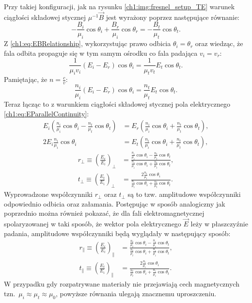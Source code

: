 Przy takiej konfiguracji, jak na rysunku \ref{ch1:img:fresnel_setup_TE} warunek ciągłości składowej stycznej $\mu^{-1}\vec{B}$ jest wyrażony poprzez następujące równanie:
\begin{equation}
-\frac{B_i}{\mu_i}\cos\theta_i + \frac{B_r}{\mu_i}\cos\theta_r = -\frac{B_t}{\mu_t}\cos\theta_t.
\end{equation}
Z \eqref{ch1:eq:EBRelationship}, wykorzystując prawo odbicia $\theta_i = \theta_r$ oraz wiedząc, że fala odbita propaguje się w tym samym ośrodku co fala padająca $v_i = v_r$:
\begin{equation}
\frac{1}{\mu_iv_i}\left( E_i - E_r \right)\cos\theta_i = \frac{1}{\mu_tv_t}E_t\cos\theta_t.
\end{equation}
Pamiętając, że $n = \frac{c}{v}$:
\begin{equation}
\frac{n_i}{\mu_i}\left(E_i - E_r \right)\cos\theta_i = \frac{n_t}{\mu_t}E_t\cos\theta_t.
\end{equation}
Teraz łącząc to z warunkiem ciągłości składowej stycznej pola elektrycznego \eqref{ch1:eq:EParallelContinuity}:
\begin{align}
E_i\left( \frac{n_i}{\mu_i}\cos\theta_i - \frac{n_t}{\mu_t}\cos\theta_t \right) &= E_r\left( \frac{n_i}{\mu_i}\cos\theta_i + \frac{n_t}{\mu_t}\cos\theta_t \right),\\
2E_i\frac{n_i}{\mu_i}\cos\theta_i &= E_t\left( \frac{n_i}{\mu_i}\cos\theta_i + \frac{n_t}{\mu_t}\cos\theta_t \right),
\end{align}
\begin{align}
\label{ch1:eq:rPerpendicularGeneral}
r_\perp\equiv \left(\frac{E_r}{E_i}\right)_\perp &= \frac{\frac{n_i}{\mu_i}\cos\theta_i - \frac{n_t}{\mu_t}\cos\theta_t}{\frac{n_i}{\mu_i}\cos\theta_i + \frac{n_t}{\mu_t}\cos\theta_t},\\
t_\perp\equiv \left(\frac{E_t}{E_i}\right)_\perp &= \frac{2\frac{n_i}{\mu_i}\cos\theta_i}{\frac{n_i}{\mu_i}\cos\theta_i + \frac{n_t}{\mu_t}\cos\theta_t}.
\end{align}
Wyprowadzone współczynniki $r_\perp$ oraz $t_\perp$ są to tzw. amplitudowe współczynniki odpowiednio odbicia oraz załamania.
Postępując w sposób analogiczny jak poprzednio można również pokazać, że dla fali elektromagnetycznej spolaryzowanej w taki sposób, że wektor pola elektrycznego $\vec{E}$ leży w płaszczyźnie padania, amplitudowe współczynniki będą wyglądały w następujący sposób:
\begin{align}
\label{ch1:eq:rParallelGeneral}
r_\parallel\equiv \left(\frac{E_r}{E_i}\right)_\parallel &= \frac{\frac{n_t}{\mu_t}\cos\theta_i - \frac{n_i}{\mu_i}\cos\theta_t}{\frac{n_t}{\mu_t}\cos\theta_i + \frac{n_i}{\mu_i}\cos\theta_t},\\
t_\parallel\equiv \left(\frac{E_t}{E_i}\right)_\parallel &= \frac{2\frac{n_i}{\mu_i}\cos\theta_i}{\frac{n_t}{\mu_t}\cos\theta_i + \frac{n_i}{\mu_i}\cos\theta_t}.
\end{align}
W przypadku gdy rozpatrywane materiały nie przejawiają cech magnetycznych tzn.~$\mu_i \approx \mu_t \approx \mu_0$, powyższe równania ulegają znacznemu uproszczeniu.

